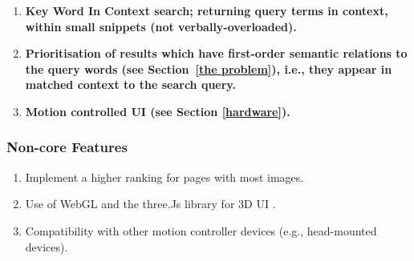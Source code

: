 \documentclass[a4paper, 11pt]{article}
\begin{document}
\begin{justify}
\begin{enumerate}
\item \textbf{Key Word In Context search; returning query terms in context, within small snippets (not verbally-overloaded).}

\item \textbf{Prioritisation of results which have first-order semantic relations to the query words (see Section~\ref{the problem}), i.e., they appear in matched context to the search query.}

\item \textbf{Motion controlled UI (see Section \ref{hardware}).}
\end{enumerate}

\subsubsection{Non-core Features}
\begin{enumerate}

\item Implement a higher ranking for pages with most images. 
\item Use of WebGL and the three.Js library for 3D UI .
\item Compatibility with other motion controller devices (e.g., head-mounted devices).

\end{enumerate}


\end{justify}
\end{document}
